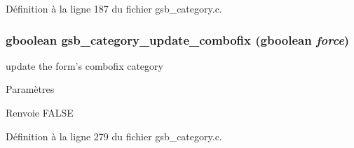 Définition à la ligne 187 du fichier gsb\_\-category.c.

\subsubsection[{gsb\_\-category\_\-update\_\-combofix}]{\setlength{\rightskip}{0pt plus 5cm}gboolean gsb\_\-category\_\-update\_\-combofix (gboolean {\em force})}\label{gsb__category_8c_a4425cec992b659cc95662174b1879e04}
update the form's combofix category


\begin{DoxyParams}{Paramètres}
\item[{\em }]\end{DoxyParams}
\begin{DoxyReturn}{Renvoie}
FALSE 
\end{DoxyReturn}


Définition à la ligne 279 du fichier gsb\_\-category.c.

